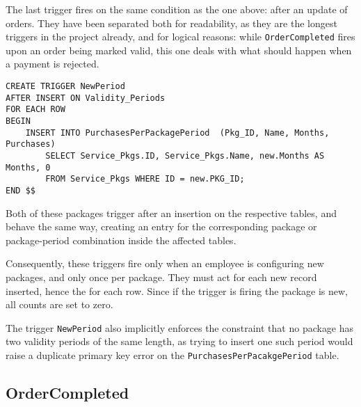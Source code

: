 The last trigger fires on the same condition as the one above: after an update of orders. They have been separated both for readability, as they are the longest triggers in the project already, and for logical reasons: while \texttt{OrderCompleted} fires upon an order being marked valid, this one deals with what should happen when a payment is rejected.

\begin{lstlisting}[style=SQL]
CREATE TRIGGER NewPeriod
AFTER INSERT ON Validity_Periods
FOR EACH ROW
BEGIN
    INSERT INTO PurchasesPerPackagePeriod  (Pkg_ID, Name, Months, Purchases)
        SELECT Service_Pkgs.ID, Service_Pkgs.Name, new.Months AS Months, 0
        FROM Service_Pkgs WHERE ID = new.PKG_ID;
END $$
\end{lstlisting}

Both of these packages trigger after an insertion on the respective tables, and behave the same way, creating an entry for the corresponding package or package-period combination inside the affected tables.

Consequently, these triggers fire only when an employee is configuring new packages, and only once per package. They must act for each new record inserted, hence the for each row. Since if the trigger is firing the package is new, all counts are set to zero.

The trigger \texttt{NewPeriod} also implicitly enforces the constraint that no package has two validity periods of the same length, as trying to insert one such period would raise a duplicate primary key error on the \texttt{PurchasesPerPacakgePeriod} table.

\subsection{OrderCompleted}

